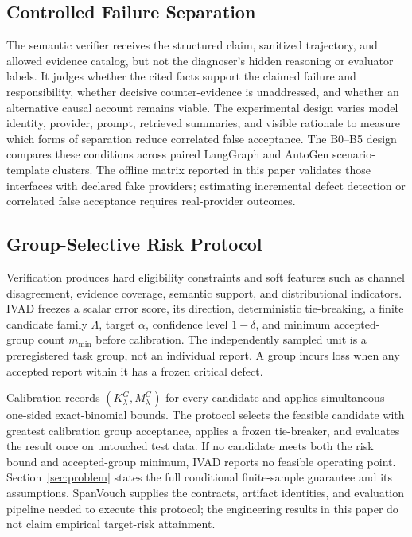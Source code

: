 \subsection{Controlled Failure Separation}

The semantic verifier receives the structured claim, sanitized trajectory, and
allowed evidence catalog, but not the diagnoser's hidden reasoning or evaluator
labels. It judges whether the cited facts support the claimed failure and
responsibility, whether decisive counter-evidence is unaddressed, and whether
an alternative causal account remains viable. The experimental design varies
model identity, provider, prompt, retrieved summaries, and visible rationale
to measure which forms of separation reduce correlated false acceptance.
The B0--B5 design compares these conditions across paired LangGraph and
AutoGen scenario-template clusters. The offline matrix reported in this paper
validates those interfaces with declared fake providers; estimating incremental
defect detection or correlated false acceptance requires real-provider outcomes.

\subsection{Group-Selective Risk Protocol}

Verification produces hard eligibility constraints and soft features such as
channel disagreement, evidence coverage, semantic support, and distributional
indicators. IVAD freezes a scalar error score, its direction, deterministic
tie-breaking, a finite candidate family $\Lambda$, target $\alpha$, confidence
level $1-\delta$, and minimum accepted-group count $m_{\min}$ before
calibration. The independently sampled unit is a preregistered task group, not
an individual report. A group incurs loss when any accepted report within it
has a frozen critical defect.

Calibration records $(K_\lambda^G,M_\lambda^G)$ for every candidate and applies
simultaneous one-sided exact-binomial bounds. The protocol selects the feasible
candidate with greatest calibration group acceptance, applies a frozen
tie-breaker, and evaluates the result once on untouched test data. If no
candidate meets both the risk bound and accepted-group minimum, IVAD reports no
feasible operating point. Section~\ref{sec:problem} states the full conditional
finite-sample guarantee and its assumptions. SpanVouch supplies the contracts,
artifact identities, and evaluation pipeline needed to execute this protocol;
the engineering results in this paper do not claim empirical target-risk
attainment.

